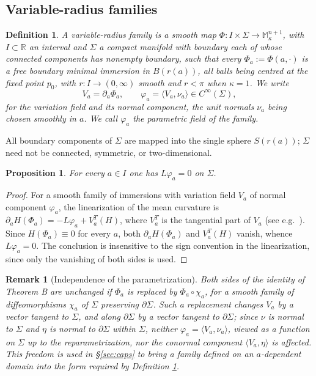 \documentclass[10pt,a4paper]{amsart}
\newtheorem{proposition}[theorem]{Proposition}
\newtheorem{definition}[theorem]{Definition}
\newtheorem{remark}[theorem]{Remark}
\newcommand{\M}{\mathbb{M}}
\newcommand{\R}{\mathbb{R}}
\begin{document}
\subsection*{Variable-radius families}

\begin{definition}\label{def:family}
A \emph{variable-radius family} is a smooth map $\Phi:I\times\Sigma\to\M^{n+1}_\kappa$, with $I\subset\R$ an interval and $\Sigma$ a compact manifold with boundary each of whose connected components has nonempty boundary, such that every $\Phi_a:=\Phi(a,\cdot)$ is a free boundary minimal immersion in $B(r(a))$, all balls being centred at the fixed point $p_0$, with $r:I\to(0,\infty)$ smooth and $r<\pi$ when $\kappa=1$. We write
\[
V_a=\partial_a\Phi_a,\qquad \varphi_a=\langle V_a,\nu_a\rangle\in C^\infty(\Sigma),
\]
for the variation field and its normal component, the unit normals $\nu_a$ being chosen smoothly in $a$. We call $\varphi_a$ the \emph{parametric field} of the family.
\end{definition}

All boundary components of $\Sigma$ are mapped into the single sphere $S(r(a))$; $\Sigma$ need not be connected, symmetric, or two-dimensional.

\begin{proposition}\label{prop:jacobi}
For every $a\in I$ one has $L\varphi_a=0$ on $\Sigma$.
\end{proposition}

\begin{proof}
For a smooth family of immersions with variation field $V_a$ of normal component $\varphi_a$, the linearization of the mean curvature is $\partial_aH(\Phi_a)=-L\varphi_a+V_a^{T}(H)$, where $V_a^T$ is the tangential part of $V_a$ (see e.g.\ \cite[\S 5]{Med23}). Since $H(\Phi_a)\equiv 0$ for every $a$, both $\partial_aH(\Phi_a)$ and $V_a^T(H)$ vanish, whence $L\varphi_a=0$. The conclusion is insensitive to the sign convention in the linearization, since only the vanishing of both sides is used.
\end{proof}

\begin{remark}[Independence of the parametrization]\label{rem:reparam}
Both sides of the identity of Theorem B are unchanged if $\Phi_a$ is replaced by $\Phi_a\circ\chi_a$, for a smooth family of diffeomorphisms $\chi_a$ of $\Sigma$ preserving $\partial\Sigma$. Such a replacement changes $V_a$ by a vector tangent to $\Sigma$, and along $\partial\Sigma$ by a vector tangent to $\partial\Sigma$; since $\nu$ is normal to $\Sigma$ and $\eta$ is normal to $\partial\Sigma$ within $\Sigma$, neither $\varphi_a=\langle V_a,\nu_a\rangle$, viewed as a function on $\Sigma$ up to the reparametrization, nor the conormal component $\langle V_a,\eta\rangle$ is affected. This freedom is used in \S\ref{sec:caps} to bring a family defined on an $a$-dependent domain into the form required by Definition \ref{def:family}.
\end{remark}
\end{document}
